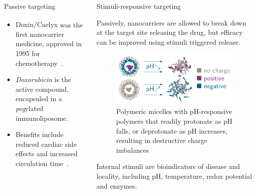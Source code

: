 \documentclass[final]{beamer}
\begin{document}
\begin{frame}[plain]
\begin{columns}[t,onlytextwidth]
\begin{block}{Passive targeting\strut}
        \begin{example}
          \begin{itemize}
            \item \alert{Doxin\textsuperscript{\textregistered}/Caelyx\textsuperscript{\textregistered}} was the first nanocarrier medicine, approved in 1995 for chemotherapy~\cite{harrison1995liposomal}.

            \item \emph{Doxorubicin} is the active compound, encapsuled in a \emph{peg}ylated immunoliposome.

            \item Benefits include \alert{reduced cardiac side effects} and \alert{increased circulation time}~\cite{wicki2015nanomedicine}.

          \end{itemize}
        \end{example}

      \end{block}

      \begin{block}{Stimuli-responsive targeting\strut}

        Passively, nanocarriers are allowed to break down at the target site releasing the drug, but efficacy can be improved using \alert{stimuli triggered release}.

        \begin{figure}
          \centering
          \includegraphics[scale=2.4]{tikz/ph_responsive.pdf}
          \caption{Polymeric micelles with pH-responsive polymers that readily protonate as pH falls, or deprotonate as pH increases, resulting in destructive charge imbalances~\cite{sun2014engineered}}
          \label{fig:ph}
        \end{figure}

        \alert{Internal stimuli} are bioindicators of disease and locality, including \alert{pH}, \alert{temperature}, \alert{redox potential} and \alert{enzymes}.


\end{block}
\end{columns}
\end{frame}
\end{document}
